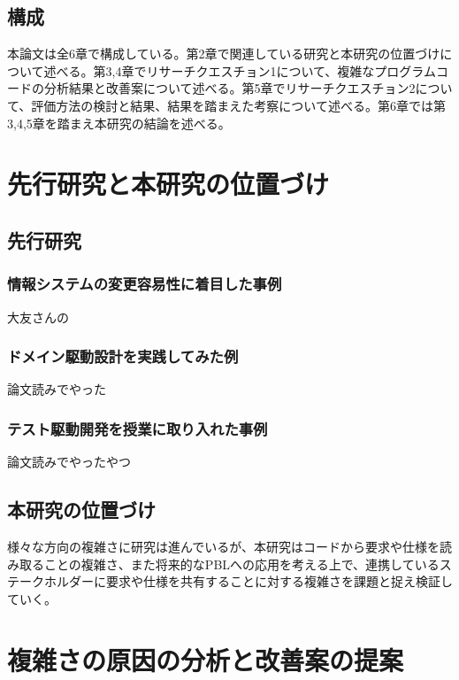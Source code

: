 \documentclass[12pt, a4paper]{jreport}
\begin{document}
\section{構成}
本論文は全6章で構成している。第2章で関連している研究と本研究の位置づけについて述べる。第3,4章でリサーチクエスチョン1について、複雑なプログラムコードの分析結果と改善案について述べる。第5章でリサーチクエスチョン2について、評価方法の検討と結果、結果を踏まえた考察について述べる。第6章では第3,4,5章を踏まえ本研究の結論を述べる。
\chapter{先行研究と本研究の位置づけ}
\section{先行研究}
\subsection{情報システムの変更容易性に着目した事例}
大友さんの
\subsection{ドメイン駆動設計を実践してみた例}
論文読みでやった
\subsection{テスト駆動開発を授業に取り入れた事例}
論文読みでやったやつ
\section{本研究の位置づけ}
様々な方向の複雑さに研究は進んでいるが、本研究はコードから要求や仕様を読み取ることの複雑さ、また将来的なPBLへの応用を考える上で、連携しているステークホルダーに要求や仕様を共有することに対する複雑さを課題と捉え検証していく。
\chapter{複雑さの原因の分析と改善案の提案}
\end{document}
